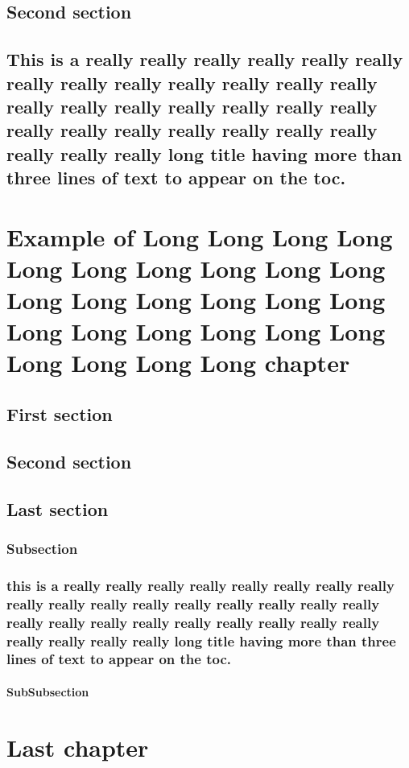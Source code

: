 \documentclass{mines-thesis}
\begin{document}
\section{Second section} \lipsum[4-5]
\section{This is a really really really really really really really really really really really really really really really really really really really really really really really really really really really really really really long title having more than three lines of text to appear on the toc.}
\lipsum[1-2]

\lipsum[1-2]

\chapter{Example of Long  Long Long Long Long Long Long Long Long Long Long Long Long Long Long Long Long Long Long Long Long Long Long Long Long Long chapter}
\lipsum[1-10]

\section{First section} \lipsum[2-3]
\section{Second section} \lipsum[4-5]
\section{Last section} \lipsum[6-7]
\subsection{Subsection}
\lipsum[4-5]
\subsection{this is a really really really really really really really really really really really really really really really really really really really really really really really really really really really really really really long title having more than three lines of text to appear on the toc.}
\subsubsection{SubSubsection}
\lipsum[1]
\chapter{Last chapter} \lipsum[1]
\end{document}
